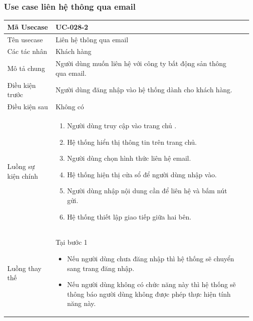 \documentclass[12pt,a4paper]{article}
\begin{document}
    \subsubsection*{Use case liên hệ thông qua email}
    \begin{table}[H]
        \centering
        \begin{tabular}{|p{3.5cm}|p{11.5cm}|c|}
            \hline
            Mã Usecase      & UC-028-2                                                          \\
            \hline
            Tên usecase     & Liên hệ thông qua email                                           \\
            \hline
            Các tác nhân    & Khách hàng                                                        \\
            \hline
            Mô tả chung     & Người dùng muốn liên hệ với công ty bất động sản thông qua email. \\
            \hline

            Điều kiện trước & Người dùng đăng nhập vào hệ thống dành cho khách hàng.            \\
            \hline

            Điều kiện sau   & Không có                                                          \\
            \hline

            Luồng sự kiện chính & \vspace{-.8cm}\begin{enumerate}
                                                    \item Người dùng truy cập vào trang chủ .
                                                    \item Hệ thống hiển thị thông tin trên trang chủ.
                                                    \item Người dùng chọn hình thức liên hệ email.
                                                    \item Hệ thống hiện thị cửa sổ để người dùng nhập vào.
                                                    \item Người dùng nhập nội dung cần để liên hệ và bấm nút gửi.
                                                    \item Hệ thống thiết lập giao tiếp giữa hai bên.
            \end{enumerate}
            \\
            \hline
            Luồng thay thế & Tại bước 1\newline
            \vspace{-.8cm}\begin{itemize}
                              \item Nếu người dùng chưa đăng nhập thì hệ thống sẽ chuyển sang trang đăng nhập.
                              \item Nếu người dùng không có chức năng này thì hệ thống sẽ thông báo người dùng không được phép thực hiện tính năng này.
            \end{itemize}


\end{tabular}
\end{table}
\end{document}
